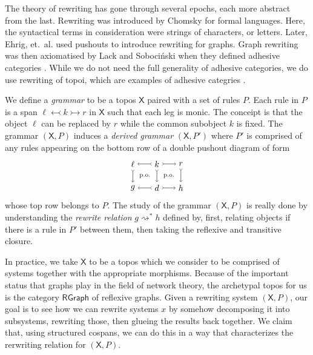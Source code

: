 \documentclass{amsart}
\newcommand{\X}{\cat{X}}
\newcommand{\RGraph}{\cat{RGraph}}
\newcommand{\cat}[1]{\mathsf{#1}}
\newcommand{\monicto}{\rightarrowtail}
\newcommand{\deriv}[2]{#1 \rightsquigarrow^\ast #2}
\newcommand{\monicgets}{\leftarrowtail}
\theoremstyle{remark}
\theoremstyle{definition}
\begin{document}
The theory of rewriting has gone through several epochs, each more
abstract from the last.  Rewriting was introduced by Chomsky for
formal languages. Here, the syntactical terms in consideration were
strings of characters, or letters.  Later, Ehrig,
et.~al. \cite{Ehrig_GraphGram} used pushouts to introduce rewriting for
graphs.  Graph rewriting was then axiomatised by Lack and
Soboci\'{n}ski when they defined adhesive categories
\cite{LackSobo_Adhesive}.  While we do not need the full generality of
adhesive categories, we do use rewriting of topoi, which are examples
of adhesive categries \cite{LackSobo_ToposIsAdh}.

We define a \emph{grammar} to be a topos $ \X $ paired with a
set of rules $ P $.  Each rule in $ P $ is a span
$ \ell \monicgets k \monicto r $ in $ \X $ such that each leg is monic.
The conceipt is that the object $ \ell $ can be replaced by $ r $
while the common subobject $ k $ is fixed.  The grammar $ ( \X , P ) $
induces a \emph{derived grammar} $ ( \X , P' ) $ where $ P' $ is
comprised of any rules appearing on the bottom row of a double pushout
diagram of form
%
\[
  \begin{tikzpicture}
    \node (1) at (0,1) {$ \ell $};
    \node (2) at (1,1) {$ k $};
    \node (3) at (2,1) {$ r $};
    \node (4) at (0,0) {$ g $};
    \node (5) at (1,0) {$ d $};
    \node (6) at (2,0) {$ h $};
    \draw [>->] (2) to node [] {\scriptsize{$  $}} (1);
    \draw [>->] (2) to node [] {\scriptsize{$  $}} (3);
    \draw [>->] (5) to node [] {\scriptsize{$  $}} (4);
    \draw [>->] (5) to node [] {\scriptsize{$  $}} (6);
    \draw [>->] (1) to node [] {\scriptsize{$  $}} (4);
    \draw [>->] (2) to node [] {\scriptsize{$  $}} (5);
    \draw [>->] (3) to node [] {\scriptsize{$  $}} (6);
    \node () at (0.5,0.5) {\scriptsize{p.o.}};
    \node () at (1.5,0.5) {\scriptsize{p.o.}};
  \end{tikzpicture}
\]
%
whose top row belongs to $ P $. The study of the grammar
$ ( \X , P ) $ is really done by understanding the \emph{rewrite
  relation} $ \deriv{g}{h} $ defined by, first, relating objects if
there is a rule in $ P' $ between them, then taking the reflexive and
transitive closure.

In practice, we take $ \X $ to be a topos which we consider to be
comprised of systems together with the appropriate morphisms.  Because
of the important status that graphs play in the field of network
theory, the archetypal topos for us is the category $ \RGraph $ of
reflexive graphs.  Given a rewriting system $ ( \X , P ) $, our goal
is to see how we can rewrite systems $ x $ by somehow decomposing it
into subsystems, rewriting those, then glueing the results back
together.  We claim that, using structured cospans, we can do this in
a way that characterizes the rerwriting relation for $ ( \X , P ) $.
\end{document}
